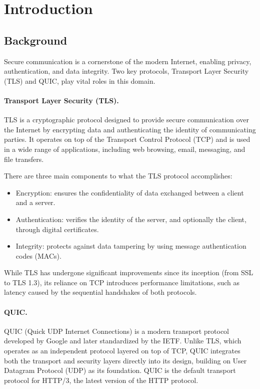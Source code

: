 \section{Introduction}

\subsection{Background}
Secure communication is a cornerstone of the modern Internet, enabling privacy, authentication, and data integrity. Two key protocols, Transport Layer Security (TLS) and QUIC, play vital roles in this domain.

\paragraph{Transport Layer Security (TLS).} TLS is a cryptographic protocol designed to provide secure communication over the Internet by encrypting data and authenticating the identity of communicating parties. It operates on top of the Transport Control Protocol (TCP) and is used in a wide range of applications, including web browsing, email, messaging, and file transfers.

There are three main components to what the TLS protocol accomplishes:

\begin{itemize}
\item Encryption: ensures the confidentiality of data exchanged between a client and a server.

\item Authentication: verifies the identity of the server, and optionally the client, through digital certificates.

\item Integrity: protects against data tampering by using message authentication codes (MACs).
\end{itemize}

While TLS has undergone significant improvements since its inception (from SSL to TLS 1.3), its reliance on TCP introduces performance limitations, such as latency caused by the sequential handshakes of both protocols.

\paragraph{QUIC.} QUIC (Quick UDP Internet Connections) is a modern transport protocol developed by Google and later standardized by the IETF. Unlike TLS, which operates as an independent protocol layered on top of TCP, QUIC integrates both the transport and security layers directly into its design, building on User Datagram Protocol (UDP) as its foundation. QUIC is the default transport protocol for HTTP/3, the latest version of the HTTP protocol.

